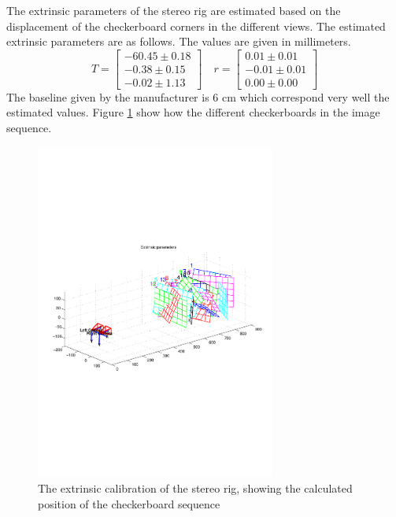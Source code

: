 The extrinsic parameters of the stereo rig are estimated based on the displacement of the
checkerboard corners in the different views. The estimated extrinsic parameters are as
follows. The values are given in millimeters. 
\begin{equation}
    T = \left[ \begin{matrix}
                -60.45 \pm 0.18\\
                -0.38 \pm 0.15\\
                -0.02 \pm  1.13 \end{matrix} \right] \quad 
    r = \left[ \begin{matrix}
                0.01 \pm 0.01\\
                -0.01 \pm 0.01 \\
                0.00 \pm 0.00  \end{matrix} \right]
\end{equation}
The baseline given by the manufacturer is 6 cm which correspond very well the estimated
values. Figure \ref{chap3:fig-stereo-extrinsic} show how the different checkerboards in
the image sequence. 
\begin{figure}[hbtp]
    \centering
    \includegraphics[width=0.7\textwidth]{pics/stereo-extrinsic}
    \caption{The extrinsic calibration of the stereo rig, showing the calculated position
    of the checkerboard sequence}
    \label{chap3:fig-stereo-extrinsic}
\end{figure}



